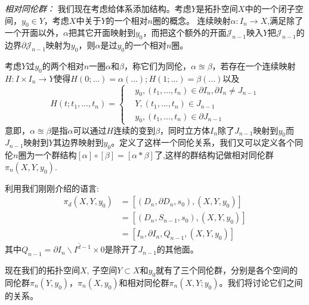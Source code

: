 \documentclass[supercite]{HustGraduPaper}
\begin{document}
\begin{appendices}
		\textit{相对同伦群：} 我们现在考虑给体系添加结构。考虑$Y$是拓扑空间$X$中的一个闭子空间，$y_0 \in Y$，考虑$X$中关于$Y$的一个相对$n$圈的概念。 连续映射$\alpha: I_n \to X$,满足除了一个开面以外，$\alpha$把其它开面映射到$y_0$，而把这个额外的开面$\mathcal{J}_{n-1}$映入$Y$把$\mathcal{J}_{n-1}$的边界$\partial \mathcal{J}_{n-1}$映射为$y_0$，则$\alpha$是过$y_0$的一个相对$n$圈。
		
		考虑$Y$过$y_0$的两个相对$n$一圈$\alpha$和$\beta$，称它们为同伦，$\alpha \approxeq \beta$，若存在一个连续映射$H: I \times I_n \to Y$使得$H(0;...) = \alpha(...); H(1;...) = \beta(...)$以及
		\begin{equation}
		H(t;t_1,\ldots,t_n) = \begin{cases}
		&y_0, (t_1,\ldots,t_n) \in \partial I_n, \partial I_n \ne J_{n-1}\\
		&Y,   (t_1,\ldots,t_n) \in J_{n-1}\\
		&y_0,(t_1,\ldots,t_n) \in \partial J_{n-1}
		\end{cases}
		\end{equation}
		意即，$\alpha \approxeq \beta$是指$\alpha$可以通过$H$连续的变到$\beta$，同时立方体$I_n$除了$J_{n-1}$映射到$y_0$而$J_{n-1}$映射到$Y$其边界映射到$y_0$。定义了这样一个同伦关系，我们又可以定义各个同伦$n$圈为一个群结构$[\alpha] \circ [\beta] = [\alpha * \beta]$了,这样的群结构记做相对同伦群$\pi_n(X,Y,y_0)$.
		
		利用我们刚刚介绍的语言:
		\begin{equation}
		\begin{aligned}
		\pi_d(X,Y,y_0) &= [(D_n,\partial D_n, s_0),(X,Y,y_0)] \\
		&=[(D_n,S_{n-1},s_0),(X,Y,y_0)]\\
		&=[I_n,\partial I_n, Q_{n-1},(X,Y,y_0)]
		\end{aligned}
		\end{equation}
		其中$Q_{n-1} = \overline{\partial I_n  \backslash I^{d-1} \times {0}}$是除开了$J_{n-1}$的其他面。
		
		现在我们的拓扑空间$X$, 子空间$Y\subset X$和$y_0$就有了三个同伦群，分别是各个空间的同伦群$\pi_n(Y,y_0)$，$\pi_n(X,y_0)$和相对同伦群$\pi_n(X,Y;y_0)$。我们将讨论它们之间的关系。
		

\end{appendices}
\end{document}
